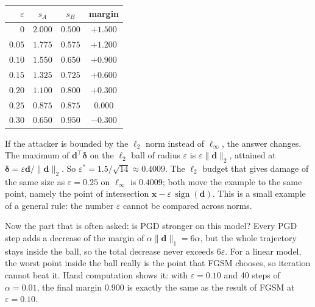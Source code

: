 \begin{center}
\begin{tabular}{rccc}
\hline
$\varepsilon$ & $s_A$ & $s_B$ & margin \\
\hline
$0$    & $2.000$ & $0.500$ & $+1.500$ \\
$0.05$ & $1.775$ & $0.575$ & $+1.200$ \\
$0.10$ & $1.550$ & $0.650$ & $+0.900$ \\
$0.15$ & $1.325$ & $0.725$ & $+0.600$ \\
$0.20$ & $1.100$ & $0.800$ & $+0.300$ \\
$0.25$ & $0.875$ & $0.875$ & $0.000$ \\
$0.30$ & $0.650$ & $0.950$ & $-0.300$ \\
\hline
\end{tabular}
\end{center}

If the attacker is bounded by the $\ell_2$ norm instead of $\ell_\infty$, the answer
changes. The maximum of $\mathbf{d}^{\top}\boldsymbol{\delta}$ on the $\ell_2$ ball of
radius $\varepsilon$ is $\varepsilon\lVert\mathbf{d}\rVert_2$, attained at
$\boldsymbol{\delta}=\varepsilon\mathbf{d}/\lVert\mathbf{d}\rVert_2$. So
$\varepsilon^{*}=1.5/\sqrt{14}\approx0.4009$. The $\ell_2$ budget that gives damage of
the same size as $\varepsilon=0.25$ on $\ell_\infty$ is
$0.4009$; both move the example to the same point, namely the point of intersection
$\mathbf{x}-\varepsilon\,\operatorname{sign}(\mathbf{d})$. This is a small example of a
general rule: the number $\varepsilon$ cannot be compared across norms.

Now the part that is often asked: is PGD stronger on this model? Every PGD step adds a
decrease of the margin of $\alpha\lVert\mathbf{d}\rVert_1
=6\alpha$, but the whole trajectory stays inside the ball, so the total decrease never
exceeds $6\varepsilon$. For a linear model, the worst point inside the ball really is
the point that FGSM chooses, so iteration cannot beat it. Hand computation shows it:
with $\varepsilon=0.10$ and 40 steps of
$\alpha=0.01$, the final margin $0.900$ is exactly the same as the result of FGSM at
$\varepsilon=0.10$.


